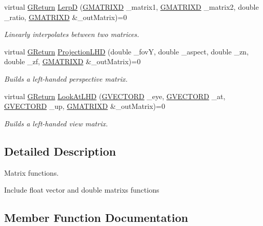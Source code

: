 \begin{DoxyCompactItemize}
virtual \hyperlink{namespaceGW_a67a839e3df7ea8a5c5686613a7a3de21}{G\+Return} \hyperlink{classGW_1_1MATH_1_1GMatrix_ad53d4038a37cafb207bda974d80009d5}{LerpD} (\hyperlink{structGW_1_1MATH_1_1GMATRIXD}{G\+M\+A\+T\+R\+I\+XD} \+\_\+matrix1, \hyperlink{structGW_1_1MATH_1_1GMATRIXD}{G\+M\+A\+T\+R\+I\+XD} \+\_\+matrix2, double \+\_\+ratio, \hyperlink{structGW_1_1MATH_1_1GMATRIXD}{G\+M\+A\+T\+R\+I\+XD} \&\+\_\+out\+Matrix)=0
\begin{DoxyCompactList}\small\item\em Linearly interpolates between two matrices. \end{DoxyCompactList}\item 
virtual \hyperlink{namespaceGW_a67a839e3df7ea8a5c5686613a7a3de21}{G\+Return} \hyperlink{classGW_1_1MATH_1_1GMatrix_ab22d0d332f4b1d2f1a1f52b2efeebabe}{Projection\+L\+HD} (double \+\_\+fovY, double \+\_\+aspect, double \+\_\+zn, double \+\_\+zf, \hyperlink{structGW_1_1MATH_1_1GMATRIXD}{G\+M\+A\+T\+R\+I\+XD} \&\+\_\+out\+Matrix)=0
\begin{DoxyCompactList}\small\item\em Builds a left-\/handed perspective matrix. \end{DoxyCompactList}\item 
virtual \hyperlink{namespaceGW_a67a839e3df7ea8a5c5686613a7a3de21}{G\+Return} \hyperlink{classGW_1_1MATH_1_1GMatrix_afa59696f30ec1fdaeb503df9b62e4ae2}{Look\+At\+L\+HD} (\hyperlink{structGW_1_1MATH_1_1GVECTORD}{G\+V\+E\+C\+T\+O\+RD} \+\_\+eye, \hyperlink{structGW_1_1MATH_1_1GVECTORD}{G\+V\+E\+C\+T\+O\+RD} \+\_\+at, \hyperlink{structGW_1_1MATH_1_1GVECTORD}{G\+V\+E\+C\+T\+O\+RD} \+\_\+up, \hyperlink{structGW_1_1MATH_1_1GMATRIXD}{G\+M\+A\+T\+R\+I\+XD} \&\+\_\+out\+Matrix)=0
\begin{DoxyCompactList}\small\item\em Builds a left-\/handed view matrix. \end{DoxyCompactList}\end{DoxyCompactItemize}


\subsection{Detailed Description}
Matrix functions. 

Include float vector and double matrix\textquotesingle{}s functions 

\subsection{Member Function Documentation}
\mbox{\label{classGW_1_1MATH_1_1GMatrix_a9ae855c7cfbfa08c84bd76a556302bc5}} 
